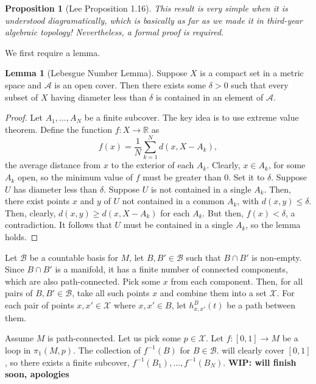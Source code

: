 \documentclass[aps,pra,showpacs,notitlepage,onecolumn,superscriptaddress,nofootinbib]{revtex4-1}
\theoremstyle{definition}
\newtheorem{lemma}{Lemma}[section]
\newtheorem{proposition}{Proposition}[section]
\begin{document}
\begin{proposition}[Lee Proposition 1.16]
\textit{This result is very simple when it is understood diagramatically, which is basically as far as we made it in third-year algebraic topology! Nevertheless, a formal proof is required.}
\newline

\noindent
We first require a lemma.
\begin{lemma}[Lebesgue Number Lemma]
Suppose $X$ is a compact set in a metric space and $\mathcal{A}$ is an open cover. Then there exists some $\delta > 0$ such that every subset of $X$ having diameter less than $\delta$ is contained in an element of $\mathcal{A}$.
\end{lemma}
\begin{proof}
  Let $A_1, \dots, A_N$ be a finite subcover. The key idea is to use extreme value theorem. Define the function $f : X \rightarrow \mathbb{R}$ as
  \begin{equation}
    f(x) = \frac{1}{N} \displaystyle\sum_{k = 1}^{N} d(x, X - A_k),
    \end{equation}
  the average distance from $x$ to the exterior of each $A_k$. Clearly, $x \in A_k$, for some $A_k$ open, so the minimum value of $f$ must be greater than $0$. Set it to $\delta$. Suppose $U$ has diameter less than
  $\delta$. Suppose $U$ is not contained in a single $A_k$. Then, there exist points $x$ and $y$ of $U$ not contained in a common $A_k$, with $d(x, y) \leq \delta$. Then, clearly, $d(x, y) \geq d(x, X - A_k)$ for each $A_k$.
  But then, $f(x) < \delta$, a contradiction. It follows that $U$ must be contained in a single $A_k$, so the lemma holds.
  \end{proof}

\noindent
Let $\mathcal{B}$ be a countable basis for $M$, let $B, B' \in \mathcal{B}$ such that $B \cap B'$ is non-empty. Since $B \cap B'$ is a manifold, it has a finite number of connected components, which
are also path-connected. Pick some $x$ from each component. Then, for all pairs of $B, B' \in \mathcal{B}$, take all such points $x$ and combine them into a set $\mathcal{X}$. For each pair of points $x, x' \in \mathcal{X}$ where $x, x' \in B$,
let $h_{x, x'}^{B}(t)$ be a path between them.

Assume $M$ is path-connected. Let us pick some $p \in \mathcal{X}$. Let $f : [0, 1] \rightarrow M$ be a loop in $\pi_1(M, p)$. The collection of $f^{-1}(B)$ for $B \in \mathcal{B}$. will clearly cover $[0, 1]$,
so there exists a finite subcover, $f^{-1}(B_1), \dots, f^{-1}(B_N)$. \textbf{WIP: will finish soon, apologies}
\end{proposition}
\end{document}
